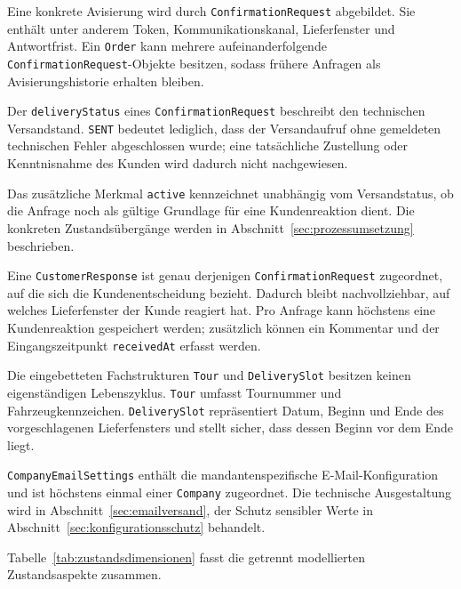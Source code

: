 \documentclass[
  12pt,
  a4paper,
  oneside
]{article}
\begin{document}
Eine konkrete Avisierung wird durch \texttt{ConfirmationRequest} abgebildet.
Sie enthält unter anderem Token, Kommunikationskanal, Lieferfenster und
Antwortfrist. Ein \texttt{Order} kann mehrere aufeinanderfolgende
\texttt{ConfirmationRequest}-Objekte besitzen, sodass frühere Anfragen als
Avisierungshistorie erhalten bleiben.

Der \texttt{deliveryStatus} eines \texttt{ConfirmationRequest} beschreibt den
technischen Versandstand. \texttt{SENT} bedeutet lediglich, dass der
Versandaufruf ohne gemeldeten technischen Fehler abgeschlossen wurde; eine
tatsächliche Zustellung oder Kenntnisnahme des Kunden wird dadurch nicht
nachgewiesen.

Das zusätzliche Merkmal \texttt{active} kennzeichnet unabhängig vom
Versandstatus, ob die Anfrage noch als gültige Grundlage für eine
Kundenreaktion dient. Die konkreten Zustandsübergänge werden in
Abschnitt~\ref{sec:prozessumsetzung} beschrieben.

Eine \texttt{CustomerResponse} ist genau derjenigen
\texttt{ConfirmationRequest} zugeordnet, auf die sich die Kundenentscheidung
bezieht. Dadurch bleibt nachvollziehbar, auf welches Lieferfenster der Kunde
reagiert hat. Pro Anfrage kann höchstens eine Kundenreaktion gespeichert
werden; zusätzlich können ein Kommentar und der Eingangszeitpunkt
\texttt{receivedAt} erfasst werden.

Die eingebetteten Fachstrukturen \texttt{Tour} und \texttt{DeliverySlot}
besitzen keinen eigenständigen Lebenszyklus. \texttt{Tour} umfasst Tournummer
und Fahrzeugkennzeichen. \texttt{DeliverySlot} repräsentiert Datum, Beginn und
Ende des vorgeschlagenen Lieferfensters und stellt sicher, dass dessen Beginn
vor dem Ende liegt.

\texttt{CompanyEmailSettings} enthält die mandantenspezifische
E-Mail-Konfiguration und ist höchstens einmal einer \texttt{Company}
zugeordnet. Die technische Ausgestaltung wird in
Abschnitt~\ref{sec:emailversand}, der Schutz sensibler Werte in
Abschnitt~\ref{sec:konfigurationsschutz} behandelt.

Tabelle~\ref{tab:zustandsdimensionen} fasst die getrennt modellierten
Zustandsaspekte zusammen.
\end{document}
